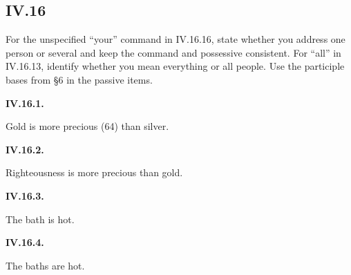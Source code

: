 \subsection*{IV.16}

For the unspecified “your” command in IV.16.16, state whether you address one person or several and keep the command and possessive consistent. For “all” in IV.16.13, identify whether you mean everything or all people. Use the participle bases from §6 in the passive items.

\par\begin{minipage}{\linewidth}\raggedright
\textbf{IV.16.1.}

Gold is more precious (64) than silver.

\end{minipage}\par\addvspace{4pt}

\par\begin{minipage}{\linewidth}\raggedright
\textbf{IV.16.2.}

Righteousness is more precious than gold.

\end{minipage}\par\addvspace{4pt}

\par\begin{minipage}{\linewidth}\raggedright
\textbf{IV.16.3.}

The bath is hot.

\end{minipage}\par\addvspace{4pt}

\par\begin{minipage}{\linewidth}\raggedright
\textbf{IV.16.4.}

The baths are hot.

\end{minipage}\par\addvspace{4pt}

